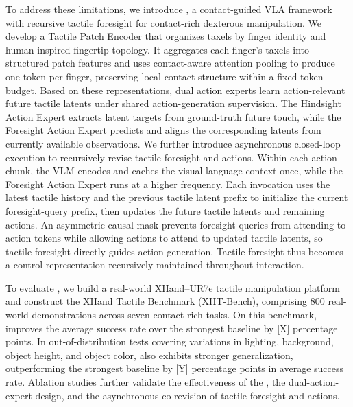 To address these limitations, we introduce \systemname, a contact-guided VLA framework with recursive tactile foresight for contact-rich dexterous manipulation. We develop a Tactile Patch Encoder that organizes taxels by finger identity and human-inspired fingertip topology. It aggregates each finger's taxels into structured patch features and uses contact-aware attention pooling to produce one token per finger, preserving local contact structure within a fixed token budget. Based on these representations, dual action experts learn action-relevant future tactile latents under shared action-generation supervision. The Hindsight Action Expert extracts latent targets from ground-truth future touch, while the Foresight Action Expert predicts and aligns the corresponding latents from currently available observations. We further introduce asynchronous closed-loop execution to recursively revise tactile foresight and actions. Within each action chunk, the VLM encodes and caches the visual-language context once, while the Foresight Action Expert runs at a higher frequency. Each invocation uses the latest tactile history and the previous tactile latent prefix to initialize the current foresight-query prefix, then updates the future tactile latents and remaining actions. An asymmetric causal mask prevents foresight queries from attending to action tokens while allowing actions to attend to updated tactile latents, so tactile foresight directly guides action generation. Tactile foresight thus becomes a control representation recursively maintained throughout interaction.


To evaluate \systemname, we build a real-world XHand--UR7e tactile manipulation platform and construct the XHand Tactile Benchmark (XHT-Bench), comprising 800 real-world demonstrations across seven contact-rich tasks. On this benchmark, \systemname improves the average success rate over the strongest baseline by [X] percentage points. In out-of-distribution tests covering variations in lighting, background, object height, and object color, \systemname also exhibits stronger generalization, outperforming the strongest baseline by [Y] percentage points in average success rate. Ablation studies further validate the effectiveness of the \Encoder, the dual-action-expert design, and the asynchronous co-revision of tactile foresight and actions.

